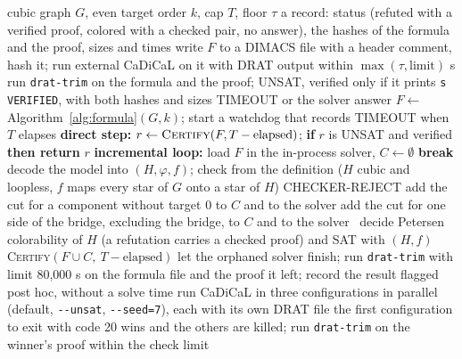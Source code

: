 \begin{algorithm}[!htbp]
\caption{Certification pipeline for one instance $(G,k)$ with time cap $T = 21{,}600$ s and floor $\tau = 600$ s. External runs use CaDiCaL with DRAT output followed by \texttt{drat-trim}; the in-process solver is the CaDiCaL 1.9.5 build of PySAT and is not part of the trusted base.}\label{alg:certify}
\begin{algorithmic}[1]
\Require cubic graph $G$, even target order $k$, cap $T$, floor $\tau$
\Ensure a record: status (refuted with a verified proof, colored with a checked pair, no answer), the hashes of the formula and the proof, sizes and times
  \State write $F$ to a DIMACS file with a header comment, hash it; run external CaDiCaL on it with DRAT output within $\max(\tau, \text{limit})$ s
   run \texttt{drat-trim} on the formula and the proof; \Return UNSAT, verified only if it prints \texttt{s VERIFIED}, with both hashes and sizes
  \EndIf
  \State \Return TIMEOUT or the solver answer
\EndProcedure
\State $F \gets$ Algorithm~\ref{alg:formula}$(G,k)$; start a watchdog that records TIMEOUT when $T$ elapses
\State \textbf{direct step:} $r \gets \textsc{Certify}(F, T - \text{elapsed})$; \textbf{if} $r$ is UNSAT and verified \textbf{then return} $r$
\State \textbf{incremental loop:} load $F$ in the in-process solver, $C \gets \emptyset$
\Loop
   \textbf{break}\EndIf
  \State decode the model into $(H,\varphi,f)$; check from the definition ($H$ cubic and loopless, $f$ maps every star of $G$ onto a star of $H$)
   \Return CHECKER-REJECT\EndIf
   add the cut for a component without target 0 to $C$ and to the solver
   add the cut for one side of the bridge, excluding the bridge, to $C$ and to the solver
  \Else\ decide Petersen colorability of $H$ (a refutation carries a checked proof) and \Return SAT with $(H,f)$
  \EndIf
\EndLoop
\State \Return \textsc{Certify}$(F \cup C,\ T - \text{elapsed})$
  \State let the orphaned solver finish; run \texttt{drat-trim} with limit 80{,}000 s on the formula file and the proof it left; record the result flagged post hoc, without a solve time
\EndProcedure
{}
  \State run CaDiCaL in three configurations in parallel (default, \texttt{-{}-unsat}, \texttt{-{}-seed=7}), each with its own DRAT file
  \State the first configuration to exit with code 20 wins and the others are killed; run \texttt{drat-trim} on the winner's proof within the check limit
\EndProcedure
\end{algorithmic}
\end{algorithm}

